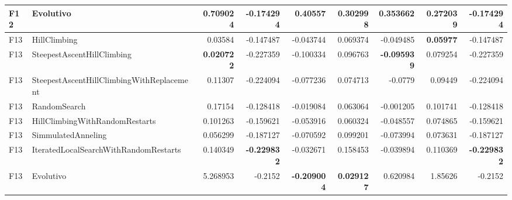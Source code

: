 \begin{tabular}{llrrrrrrr}
F12 & Evolutivo & 0.709024 & -0.174294 & 0.40557 & 0.302998 & 0.353662 & 0.272039 & -0.174294 \\ 
\midrule
F13 & HillClimbing & 0.03584 & -0.147487 & -0.043744 & 0.069374 & -0.049485 & \textbf{0.05977} & -0.147487 \\ 
F13 & SteepestAscentHillClimbing & \textbf{0.020722} & -0.227359 & -0.100334 & 0.096763 & \textbf{-0.095939} & 0.079254 & -0.227359 \\ 
F13 & SteepestAscentHillClimbingWithReplacement & 0.11307 & -0.224094 & -0.077236 & 0.074713 & -0.0779 & 0.09449 & -0.224094 \\ 
F13 & RandomSearch & 0.17154 & -0.128418 & -0.019084 & 0.063064 & -0.001205 & 0.101741 & -0.128418 \\ 
F13 & HillClimbingWithRandomRestarts & 0.101263 & -0.159621 & -0.053916 & 0.060324 & -0.048557 & 0.074865 & -0.159621 \\ 
F13 & SimmulatedAnneling & 0.056299 & -0.187127 & -0.070592 & 0.099201 & -0.073994 & 0.073631 & -0.187127 \\ 
F13 & IteratedLocalSearchWithRandomRestarts & 0.140349 & \textbf{-0.229832} & -0.032671 & 0.158453 & -0.039894 & 0.110369 & \textbf{-0.229832} \\ 
F13 & Evolutivo & 5.268953 & -0.2152 & \textbf{-0.209004} & \textbf{0.029127} & 0.620984 & 1.85626 & -0.2152 \\ 
\bottomrule
\end{tabular}
